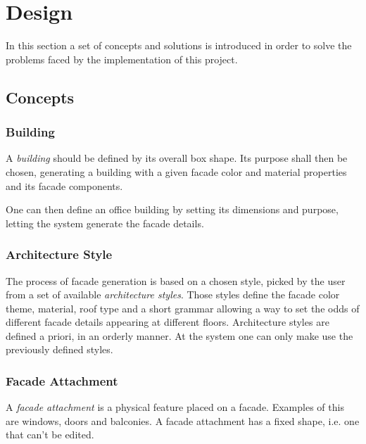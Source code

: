 \chapter{Design}

In this section a set of concepts and solutions is introduced in order to solve the problems faced
by the implementation of this project.




\section{Concepts}
\label{sec:concepts}

\subsection{Building}

A \emph{building} should be defined by its overall box shape.
Its purpose shall then be chosen, generating a building
with a given facade color and material properties and
its facade components.

One can then define an office building by setting its dimensions
and purpose, letting the system generate the facade details.


\subsection{Architecture Style}

The process of facade generation is based on a chosen style,
picked by the user from a set of available \emph{architecture styles}.
Those styles define the facade color theme, material, roof type and 
a short grammar allowing a way to set the odds of different facade details appearing
at different floors.
Architecture styles are defined a priori, in an orderly manner.
At the system one can only make use the previously defined styles.



\subsection{Facade Attachment}

A \emph{facade attachment} is a physical feature placed on a facade.
Examples of this are windows, doors and balconies.
A facade attachment has a fixed shape, i.e. one that can't be edited.

